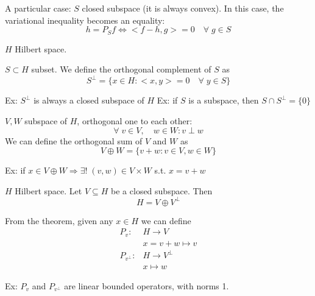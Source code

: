 \begin{remark}
    A particular case: \(S\) closed subspace (it is always convex). In this case, the variational inequality becomes an equality:
    \[
        h = P_S f \iff <f-h, g> = 0 \quad  \forall \; g \in S
    \]
\end{remark}

\(H\) Hilbert space. 
\begin{definition}
    \(S \subset H\) subset. We define the orthogonal complement of \(S\) as 
    \[
        S^\perp = \{ x \in H: <x, y> = 0 \quad \forall\; y \in S\}
    \]
\end{definition}
Ex: \(S^\perp \) is always a closed subspace of \(H\)
Ex: if \(S\) is a subspace, then \(S \cap S^\perp = \{0\}\)

\begin{definition}
    \(V, W\) subspace of \(H\), orthogonal one to each other:
    \[
        \forall \; v \in V, \quad w \in W: v \perp w
    \]
    We can define the orthogonal sum of \(V\) and \(W\) as 
    \[
        V \oplus W = \{ v+w : v \in V, w \in W \}
    \]
\end{definition}
Ex: if \(x \in V \oplus W \Rightarrow \exists! \; (v, w) \in V \times W\) s.t. \(x=v+w\)

\begin{theorem}
    \(H\) Hilbert space. Let \(V \subseteq H\) be a closed subspace. Then 
    \[
        H = V \oplus V^\perp
    \]
\end{theorem}

\begin{definition}
    From the theorem, given any \(x \in H\) we can define
    \[
        \begin{array}{rl}
            P_v: & H \to V \\
            & x = v + w \mapsto v \\ \tag*{orthogonal projections}
            P_{v^\perp} : & H \to V^\perp \\
            & x \mapsto w
        \end{array}
    \]
\end{definition}
Ex: \(P_v \) and \(P_{v^\perp}\) are linear bounded operators, with norms 1.



